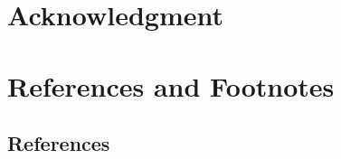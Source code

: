 \documentclass[journal,twoside,web]{ieeecolor}
\begin{document}
\section*{Acknowledgment}




\section*{References and Footnotes}
\subsection{References}

\nocite{*}
















\end{document}

